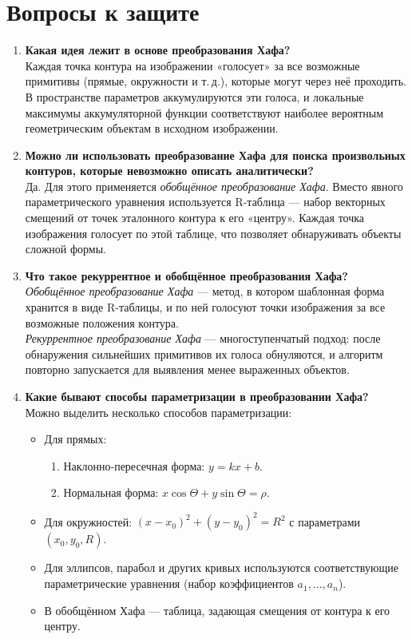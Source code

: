 \documentclass[a4paper,12pt]{article}
\begin{document}
\section{Вопросы к защите}
\begin{enumerate}
    \item \textbf{Какая идея лежит в основе преобразования Хафа?}\\[0.3em]
    Каждая точка контура на изображении «голосует» за все возможные примитивы (прямые, окружности и т.\,д.), которые могут через неё проходить. В пространстве параметров аккумулируются эти голоса, и локальные максимумы аккумуляторной функции соответствуют наиболее вероятным геометрическим объектам в исходном изображении.

    \item \textbf{Можно ли использовать преобразование Хафа для поиска произвольных контуров, которые невозможно описать аналитически?}\\[0.3em]
    Да. Для этого применяется \emph{обобщённое преобразование Хафа}. Вместо явного параметрического уравнения используется R-таблица — набор векторных смещений от точек эталонного контура к его «центру». Каждая точка изображения голосует по этой таблице, что позволяет обнаруживать объекты сложной формы.

    \item \textbf{Что такое рекуррентное и обобщённое преобразования Хафа?} \\[0.3em]
    \emph{Обобщённое преобразование Хафа} — метод, в котором шаблонная форма хранится в виде R-таблицы, и по ней голосуют точки изображения за все возможные положения контура.\\
    \emph{Рекуррентное преобразование Хафа} — многоступенчатый подход: после обнаружения сильнейших примитивов их голоса обнуляются, и алгоритм повторно запускается для выявления менее выраженных объектов.
    \item \textbf{Какие бывают способы параметризации в преобразовании Хафа?} \\[0.3em]
    Можно выделить несколько способов параметризации:
    \begin{itemize}
        \item Для прямых:
          \begin{enumerate}
            \item Наклонно‑пересечная форма: \(y = kx + b\).
            \item Нормальная форма: \(x\cos\Theta + y\sin\Theta = \rho\).
          \end{enumerate}
        \item Для окружностей: \((x - x_0)^2 + (y - y_0)^2 = R^2\) с параметрами \((x_0,y_0,R)\).
        \item Для эллипсов, парабол и других кривых используются соответствующие параметрические уравнения (набор коэффициентов \(a_1,\dots,a_n\)).
        \item В обобщённом Хафа — таблица, задающая смещения от контура к его центру.
      \end{itemize}
\end{enumerate}
\end{document}
